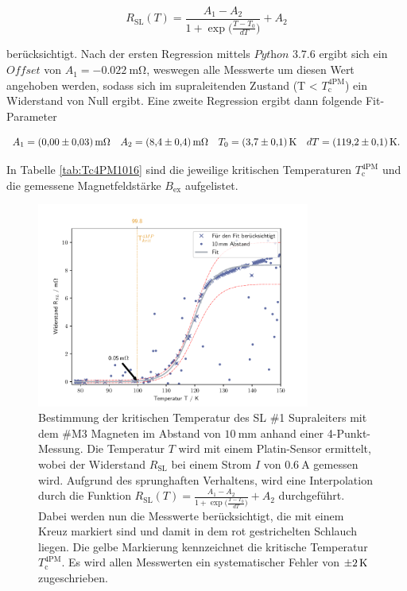 \begin{equation*}
	R_{\text{SL}}(T) = \frac{A_1 - A_2}{1+\exp\bigl( \frac{T-T_0}{dT} \bigr)} + A_2
\end{equation*}

\noindent
berücksichtigt. Nach der ersten Regression mittels $\textit{Python 3.7.6}$
ergibt sich ein $\textit{Offset}$ von $A_1 = \SI{-0.022}{\milli\ohm}$, weswegen
alle Messwerte um diesen Wert angehoben werden, sodass sich im supraleitenden
Zustand (T < $T^{\text{4PM}}_{\text{c}}$) ein Widerstand von Null ergibt. Eine
zweite Regression ergibt dann folgende Fit-Parameter

\begin{equation*}
	A_1 = \SI{0\pm0.03}{\milli\ohm}
	\quad
	A_2 = \SI{8.4\pm0.4}{\milli\ohm}
	\quad
	T_0 = \SI{3.7\pm0.1}{\kelvin}
	\quad
	dT	= \SI{119.2\pm0.1}{\kelvin}.
\end{equation*}

\noindent
In Tabelle \ref{tab:Tc4PM1016} sind die jeweilige kritischen Temperaturen
$T^{\text{4PM}}_{\text{c}}$ und die gemessene Magnetfeldstärke $B_{\text{ex}}$
aufgelistet.




\begin{figure}[H]
    \centering
    \includegraphics[width=0.8\textwidth]{Auswertung/T_krit_Pt/R_T_10mm.pdf}
    \caption{Bestimmung der kritischen Temperatur des SL \#1 Supraleiters mit dem
		\#M3 Magneten im Abstand von $\SI{10}{\milli\meter}$ anhand einer 4-Punkt-Messung.
		Die Temperatur $T$ wird mit einem Platin-Sensor	ermittelt, wobei der Widerstand
		$R_{\text{SL}}$ bei einem Strom $I$ von $\SI{0.6}{\ampere}$ gemessen wird.
		Aufgrund des sprunghaften Verhaltens, wird eine Interpolation durch die
		Funktion $R_{\text{SL}}(T) = \frac{A_1 - A_2}{1+\exp\bigl( \frac{T-T_0}{dT} \bigr)} + A_2$
		durchgeführt. Dabei werden nun die Messwerte berücksichtigt, die mit einem Kreuz
		markiert sind und damit in dem rot gestrichelten Schlauch liegen.
		Die gelbe Markierung kennzeichnet die kritische Temperatur $T^{\text{4PM}}_{\text{c}}$.
		Es wird allen Messwerten ein systematischer Fehler von $\SI{\pm2}{\kelvin}$
		zugeschrieben.}
    \label{fig:Tc4PM10}
\end{figure}

